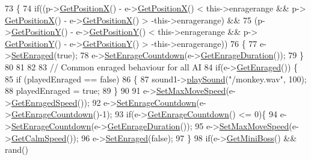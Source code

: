 \begin{DoxyCode}
73 \{
74     \textcolor{keywordflow}{if}((p->\hyperlink{classPlayerObject_aa84a7779304b680fa32b88b01ba95d02}{GetPositionX}() - e->\hyperlink{classAI_ade2ee4c9c75cdf9f4edd85227193e73d}{GetPositionX}() < this->enragerange && p->
      \hyperlink{classPlayerObject_aa84a7779304b680fa32b88b01ba95d02}{GetPositionX}() - e->\hyperlink{classAI_ade2ee4c9c75cdf9f4edd85227193e73d}{GetPositionX}() > -this->enragerange) &&
75        (p->\hyperlink{classPlayerObject_ad17b9ec44299f4dc9ca20064c883496b}{GetPositionY}() - e->\hyperlink{classAI_af234b480b8502f3dc1b1f3bac15e8b98}{GetPositionY}() <  this->enragerange && p->
      \hyperlink{classPlayerObject_ad17b9ec44299f4dc9ca20064c883496b}{GetPositionY}() - e->\hyperlink{classAI_af234b480b8502f3dc1b1f3bac15e8b98}{GetPositionY}() > -this->enragerange))
76     \{
77         e->\hyperlink{classAI_a9fbf2081f38575bc61a7f251b2bb9a3b}{SetEnraged}(\textcolor{keyword}{true});
78         e->\hyperlink{classAI_af9e9f4b5bef37e9800dbeb5e20adddf2}{SetEnrageCountdown}(e->\hyperlink{classAI_a41d1bb99dc6892c367c23a799ad9aec6}{GetEnrageDuration}());
79     \}
80 
81 
82 
83     \textcolor{comment}{// Common enraged behaviour for all AI}
84     \textcolor{keywordflow}{if}(e->\hyperlink{classAI_aec03758c556c899055e9cbaf255dc500}{GetEnraged}()) \{
85         \textcolor{keywordflow}{if} (playedEnraged == \textcolor{keyword}{false})
86         \{
87             sound1->\hyperlink{classSounds_a5a93229c3804b9364b324a4e6245fcbe}{playSound}(\textcolor{stringliteral}{"/monkey.wav"}, 100);
88             playedEnraged = \textcolor{keyword}{true};
89         \}
90 
91         e->\hyperlink{classAI_a4423ec546f1d37cec368321e119ac6b0}{SetMaxMoveSpeed}(e->\hyperlink{classAI_a92907b66d44bf13562d95e54cc5513b6}{GetEnragedSpeed}());
92         e->\hyperlink{classAI_af9e9f4b5bef37e9800dbeb5e20adddf2}{SetEnrageCountdown}(e->\hyperlink{classAI_adfd6fae7457c89e305d4d3f17ddc41a1}{GetEnrageCountdown}()-1);
93         \textcolor{keywordflow}{if}(e->\hyperlink{classAI_adfd6fae7457c89e305d4d3f17ddc41a1}{GetEnrageCountdown}() <= 0)\{
94             e->\hyperlink{classAI_af9e9f4b5bef37e9800dbeb5e20adddf2}{SetEnrageCountdown}(e->\hyperlink{classAI_a41d1bb99dc6892c367c23a799ad9aec6}{GetEnrageDuration}());
95             e->\hyperlink{classAI_a4423ec546f1d37cec368321e119ac6b0}{SetMaxMoveSpeed}(e->\hyperlink{classAI_adaccf4bbe450127d198e46d7b8cf4f5c}{GetCalmSpeed}());
96             e->\hyperlink{classAI_a9fbf2081f38575bc61a7f251b2bb9a3b}{SetEnraged}(\textcolor{keyword}{false});
97         \}
98         \textcolor{keywordflow}{if}(e->\hyperlink{classAI_a4b16ff859e873a2fe1b5b2eae5a7c5ab}{GetMiniBoss}() && rand() %

\end{DoxyCode}
